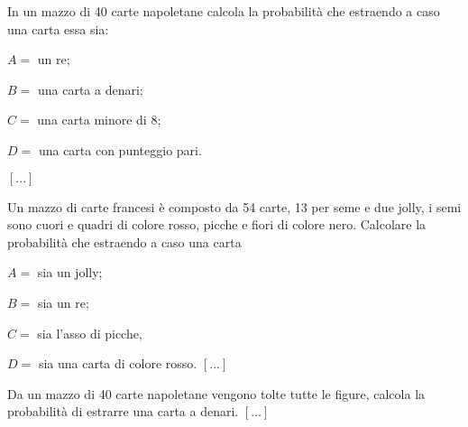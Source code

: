 \begin{esercizio}
 \label{ese:9.20}
 In un mazzo di 40 carte napoletane calcola la probabilità che estraendo a caso 
una carta essa sia:
\begin{multicols}{2}
\begin{itemize*}
\item \( A= \) un re;
\item \( B= \) una carta a denari;
\item \( C= \) una carta minore di 8;
\item \( D = \) una carta con punteggio pari.
\end{itemize*}
\end{multicols}
\hfill \(\left[...\right]\)
\end{esercizio}

\begin{esercizio}
 \label{ese:9.21}
Un mazzo di carte francesi è composto da 54 carte, 13 per seme e due jolly, i 
semi sono cuori e quadri di colore rosso, picche e fiori di colore nero. 
Calcolare la probabilità che estraendo a caso una carta
\begin{multicols}{2}
\begin{itemize*}
\item \( A= \) sia un jolly;
\item \( B= \) sia un re;
\item \( C= \) sia l'asso di picche,
\item \( D= \) sia una carta di colore rosso.
\hfill \(\left[...\right]\)
\end{itemize*}
\end{multicols}
\end{esercizio}

\begin{esercizio}
 \label{ese:9.22}
Da un mazzo di 40 carte napoletane vengono tolte tutte le figure, calcola la 
probabilità di estrarre una carta a denari.
\hfill \(\left[...\right]\)
\end{esercizio}


